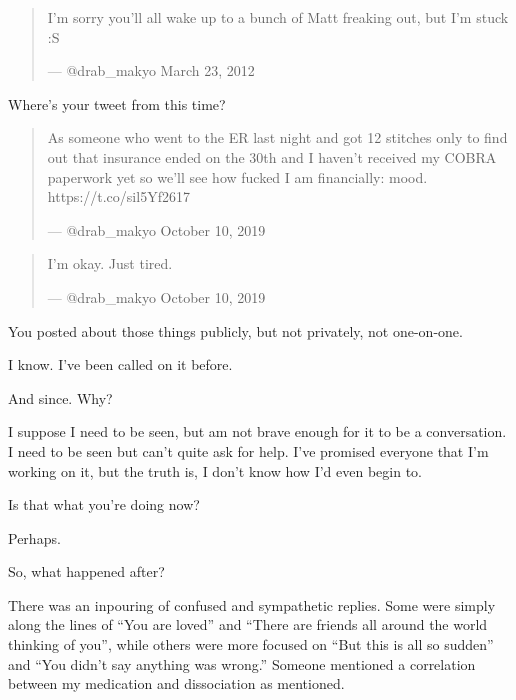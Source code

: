 \begin{paracol}{2}
\begin{leftcolumn}
\begin{quotation}
\noindent I'm sorry you'll all wake up to a bunch of Matt freaking out, but I'm stuck :S

--- @drab\_makyo March 23, 2012
\end{quotation}

\begin{ally}
Where's your tweet from this time?
\end{ally}

\begin{quotation}
\noindent As someone who went to the ER last night and got 12 stitches only to find out that insurance ended on the 30th and I haven't received my COBRA paperwork yet so we'll see how fucked I am financially: mood. https://t.co/sil5Yf2617

--- @drab\_makyo October 10, 2019
\end{quotation}
\newpage
\null
\vfill
\begin{quotation}
\noindent I'm okay. Just tired.

--- @drab\_makyo October 10, 2019
\end{quotation}
\vfill
\newpage

\begin{ally}
You posted about those things publicly, but not privately, not one-on-one.
\end{ally}
I know. I've been called on it before.

\begin{ally}
And since. Why?
\end{ally}
I suppose I need to be seen, but am not brave enough for it to be a conversation. I need to be seen but can't quite ask for help. I've promised everyone that I'm working on it, but the truth is, I don't know how I'd even begin to.

\begin{ally}
Is that what you're doing now?
\end{ally}
Perhaps.
\newpage

\begin{ally}
So, what happened after?
\end{ally}
There was an inpouring of confused and sympathetic replies. Some were simply along the lines of ``You are loved'' and ``There are friends all around the world thinking of you'', while others were more focused on ``But this is all so sudden'' and ``You didn't say anything was wrong.'' Someone mentioned a correlation between my medication and dissociation as mentioned.


\end{leftcolumn}
\end{paracol}
